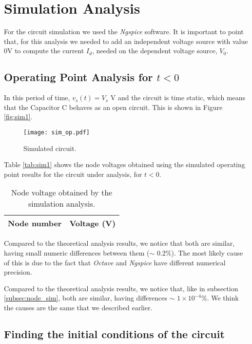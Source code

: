 \section{Simulation Analysis}
\label{sec:simulation}

For the circuit simulation we used the \textit{Ngspice} software. It is important to point that, for this analysis we needed to add an independent voltage source with value 0V to compute the current $I_d$, needed on the dependent voltage source, $V_0$.

\subsection{Operating Point Analysis for $t<0$}
\label{subsec:op_point}

In this period of time, $v_s (t)= V_s$ V and the circuit is time static, which means that the Capacitor C behaves as an open circuit. This is shown in Figure \ref{fig:sim1}.

\begin{figure}[H] \centering
\texttt{[image: sim\_op.pdf]}
\caption{Simulated circuit.}
\label{fig:sim_op}
\end{figure}

Table \ref{tab:sim1} shows the node voltages obtained using the simulated operating point results for the circuit under analysis, for $t<0$.
\begin{table}[H]
  \centering
  \begin{tabular}{|l|r|}
    \hline    
    {\bf Node number} & {\bf Voltage (V)} \\ \hline
    
  \end{tabular}
  \caption{Node voltage obtained by the simulation analysis.}
  \label{tab:sim_op_V}
\end{table}

Compared to the theoretical analysis results, we notice that both are similar, having small numeric differences between them ($\sim$ 0.2\%). The most likely cause of this is due to the fact that \textit{Octave} and \textit{Ngspice} have different numerical precision.


Compared to the theoretical analysis results, we notice that, like in subsection \ref{subsec:node_sim}, both are similar, having differences $\sim$ $1\times10^{-4}$\%. We think the causes are the same that we described earlier.

\subsection{Finding the initial conditions of the circuit}
\label{subsec:init_conds}

